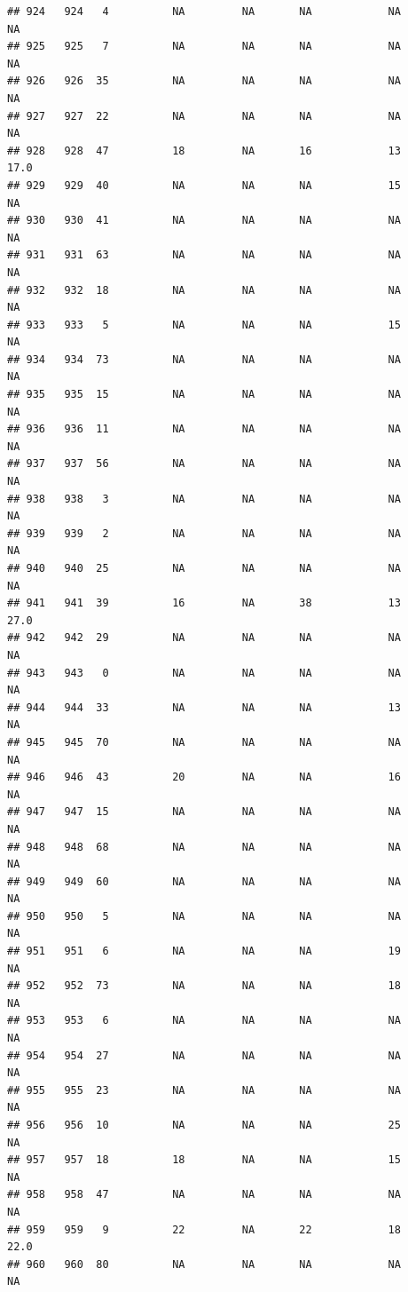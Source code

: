 \documentclass[man]{apa6}
\begin{document}
\begin{verbatim}
## 924   924   4          NA         NA       NA            NA       NA
## 925   925   7          NA         NA       NA            NA       NA
## 926   926  35          NA         NA       NA            NA       NA
## 927   927  22          NA         NA       NA            NA       NA
## 928   928  47          18         NA       16            13     17.0
## 929   929  40          NA         NA       NA            15       NA
## 930   930  41          NA         NA       NA            NA       NA
## 931   931  63          NA         NA       NA            NA       NA
## 932   932  18          NA         NA       NA            NA       NA
## 933   933   5          NA         NA       NA            15       NA
## 934   934  73          NA         NA       NA            NA       NA
## 935   935  15          NA         NA       NA            NA       NA
## 936   936  11          NA         NA       NA            NA       NA
## 937   937  56          NA         NA       NA            NA       NA
## 938   938   3          NA         NA       NA            NA       NA
## 939   939   2          NA         NA       NA            NA       NA
## 940   940  25          NA         NA       NA            NA       NA
## 941   941  39          16         NA       38            13     27.0
## 942   942  29          NA         NA       NA            NA       NA
## 943   943   0          NA         NA       NA            NA       NA
## 944   944  33          NA         NA       NA            13       NA
## 945   945  70          NA         NA       NA            NA       NA
## 946   946  43          20         NA       NA            16       NA
## 947   947  15          NA         NA       NA            NA       NA
## 948   948  68          NA         NA       NA            NA       NA
## 949   949  60          NA         NA       NA            NA       NA
## 950   950   5          NA         NA       NA            NA       NA
## 951   951   6          NA         NA       NA            19       NA
## 952   952  73          NA         NA       NA            18       NA
## 953   953   6          NA         NA       NA            NA       NA
## 954   954  27          NA         NA       NA            NA       NA
## 955   955  23          NA         NA       NA            NA       NA
## 956   956  10          NA         NA       NA            25       NA
## 957   957  18          18         NA       NA            15       NA
## 958   958  47          NA         NA       NA            NA       NA
## 959   959   9          22         NA       22            18     22.0
## 960   960  80          NA         NA       NA            NA       NA

\end{verbatim}
\end{document}
